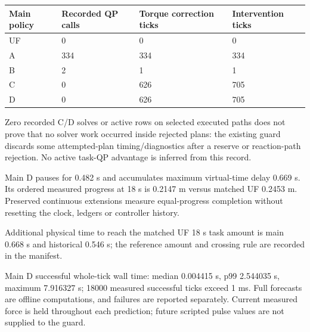 \documentclass[10pt,letterpaper]{article}
\renewcommand{\arraystretch}{1.1}
\begin{document}
\begingroup
\small
\setlength{\tabcolsep}{4pt}
\renewcommand{\arraystretch}{1.16}
\begin{tabular}{@{}llll@{}}
\toprule
\textbf{Main policy} & \textbf{Recorded QP calls} & \textbf{Torque correction ticks} & \textbf{Intervention ticks} \\
\midrule
UF & 0 & 0 & 0 \\
A & 334 & 334 & 334 \\
B & 2 & 1 & 1 \\
C & 0 & 626 & 705 \\
D & 0 & 626 & 705 \\
\bottomrule
\end{tabular}
\endgroup


Zero recorded C/D solves or active rows on selected executed paths does not prove that no solver work occurred inside rejected plans: the existing guard discards some attempted-plan timing/diagnostics after a reserve or reaction-path rejection. No active task-QP advantage is inferred from this record.


Main D pauses for 0.482 s and accumulates maximum virtual-time delay 0.669 s. Its ordered measured progress at 18 s is 0.2147 m versus matched UF 0.2453 m. Preserved continuous extensions measure equal-progress completion without resetting the clock, ledgers or controller history.


Additional physical time to reach the matched UF 18 s task amount is main 0.668 s and historical 0.546 s; the reference amount and crossing rule are recorded in the manifest.


Main D successful whole-tick wall time: median 0.004415 s, p99 2.544035 s, maximum 7.916327 s; 18000 measured successful ticks exceed 1 ms. Full forecasts are offline computations, and failures are reported separately. Current measured force is held throughout each prediction; future scripted pulse values are not supplied to the guard.


\clearpage
\end{document}
